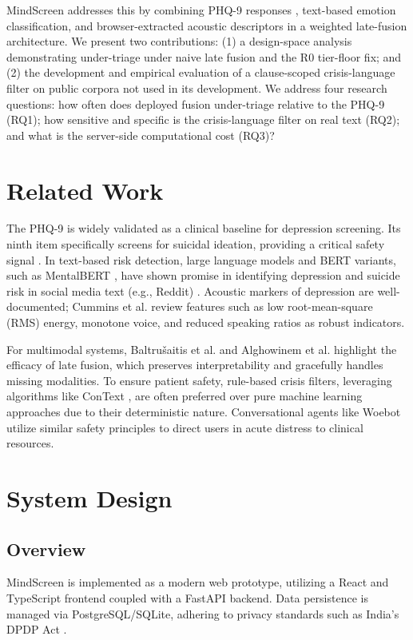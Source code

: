 \documentclass[conference]{IEEEtran}
\begin{document}
MindScreen addresses this by combining PHQ-9 responses \cite{kroenke_phq9}, text-based emotion classification, and browser-extracted acoustic descriptors in a weighted late-fusion architecture. We present two contributions: (1) a design-space analysis demonstrating under-triage under naive late fusion and the R0 tier-floor fix; and (2) the development and empirical evaluation of a clause-scoped crisis-language filter on public corpora not used in its development. We address four research questions: how often does deployed fusion under-triage relative to the PHQ-9 (RQ1); how sensitive and specific is the crisis-language filter on real text (RQ2); and what is the server-side computational cost (RQ3)?

\section{Related Work}
The PHQ-9 \cite{kroenke_phq9} is widely validated as a clinical baseline for depression screening. Its ninth item specifically screens for suicidal ideation, providing a critical safety signal \cite{rossom_item9, kroenke_phq8}. In text-based risk detection, large language models and BERT variants, such as MentalBERT \cite{ji_mentalbert}, have shown promise in identifying depression and suicide risk in social media text (e.g., Reddit) \cite{ruiz_reddit, zirikly_clpsych, mcbain_llm_suicide, moore_llm_stigma}. Acoustic markers of depression are well-documented; Cummins et al. \cite{cummins_speech} review features such as low root-mean-square (RMS) energy, monotone voice, and reduced speaking ratios as robust indicators. 

For multimodal systems, Baltru\v{s}aitis et al. \cite{baltrusaitis_survey} and Alghowinem et al. \cite{alghowinem_multimodal} highlight the efficacy of late fusion, which preserves interpretability and gracefully handles missing modalities. To ensure patient safety, rule-based crisis filters, leveraging algorithms like ConText \cite{harkema_context}, are often preferred over pure machine learning approaches due to their deterministic nature. Conversational agents like Woebot \cite{fitzpatrick_woebot} utilize similar safety principles to direct users in acute distress to clinical resources.

\section{System Design}

\subsection{Overview}
MindScreen is implemented as a modern web prototype, utilizing a React and TypeScript frontend coupled with a FastAPI backend. Data persistence is managed via PostgreSQL/SQLite, adhering to privacy standards such as India's DPDP Act \cite{pdpa_india}.
\end{document}
